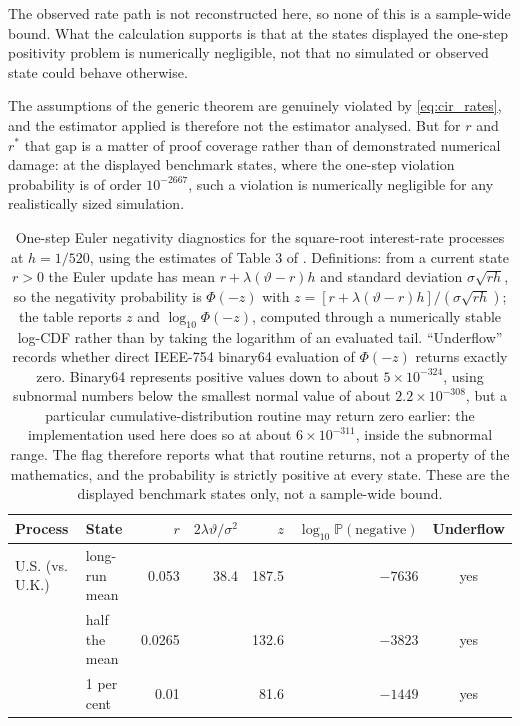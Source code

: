 \documentclass[11pt]{article}
\theoremstyle{definition}
\newcommand{\Pp}{\mathbb{P}}
\begin{document}
The observed rate path is not reconstructed here, so none of this is a sample-wide bound. What the calculation supports is that at the states displayed the one-step positivity problem is numerically negligible, not that no simulated or observed state could behave otherwise.

The assumptions of the generic theorem are genuinely violated by \eqref{eq:cir_rates}, and the estimator applied is therefore not the estimator analysed. But for $r$ and $r^*$ that gap is a matter of proof coverage rather than of demonstrated numerical damage: at the displayed benchmark states, where the one-step violation probability is of order $10^{-2667}$, such a violation is numerically negligible for any realistically sized simulation.

\begin{table}[htbp]
\centering
\caption{One-step Euler negativity diagnostics for the square-root interest-rate processes at $h=1/520$, using the estimates of Table 3 of \citet{BrandtSantaClara2002}. Definitions: from a current state $r>0$ the Euler update has mean $r+\lambda(\vartheta-r)h$ and standard deviation $\sigma\sqrt{rh}$, so the negativity probability is $\Phi(-z)$ with $z=[r+\lambda(\vartheta-r)h]/(\sigma\sqrt{rh})$; the table reports $z$ and $\log_{10}\Phi(-z)$, computed through a numerically stable log-CDF rather than by taking the logarithm of an evaluated tail. ``Underflow'' records whether direct IEEE-754 binary64 evaluation of $\Phi(-z)$ returns exactly zero. Binary64 represents positive values down to about $5\times10^{-324}$, using subnormal numbers below the smallest normal value of about $2.2\times10^{-308}$, but a particular cumulative-distribution routine may return zero earlier: the implementation used here does so at about $6\times10^{-311}$, inside the subnormal range. The flag therefore reports what that routine returns, not a property of the mathematics, and the probability is strictly positive at every state. These are the displayed benchmark states only, not a sample-wide bound.}
\label{tab:cir_negativity}
\small
\begin{tabular}{llrrrrc}
\toprule
Process & State & $r$ & $2\lambda\vartheta/\sigma^2$ & $z$ & $\log_{10}\Pp(\text{negative})$ & Underflow \\
\midrule
U.S. (vs. U.K.) & long-run mean & 0.053 & 38.4 & 187.5 & $-7636$ & yes \\
 & half the mean & 0.0265 & & 132.6 & $-3823$ & yes \\
 & 1 per cent & 0.01 & & 81.6 & $-1449$ & yes \\

\end{tabular}
\end{table}
\end{document}
